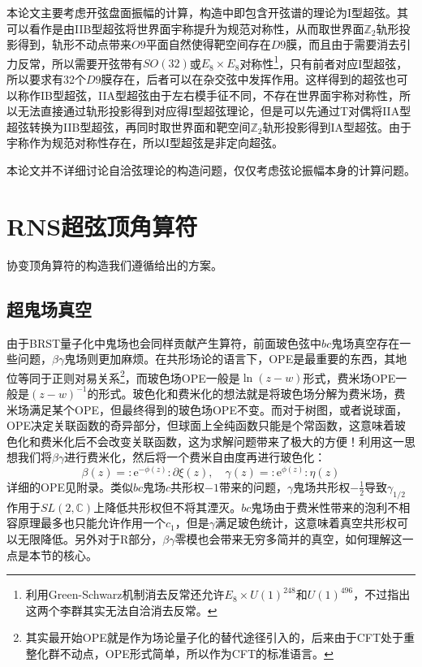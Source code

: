 本论文主要考虑开弦盘面振幅的计算，构造中即包含开弦谱的理论为I型超弦。其可以看作是由IIB型超弦将世界面宇称提升为规范对称性，从而取世界面$\mathbb{Z}_2$轨形投影得到，轨形不动点带来$O9$平面自然使得靶空间存在$D9$膜，而且由于需要消去引力反常，所以需要开弦带有$SO(32)$或$E_8\times E_8$对称性\footnote{利用Green-Schwarz机制消去反常还允许$E_8\times U(1)^{248}$和$U(1)^{496}$，不过\cite{PhysRevLett.105.071601}指出这两个李群其实无法自洽消去反常。}，只有前者对应I型超弦，所以要求有32个$D9$膜存在，后者可以在杂交弦中发挥作用。这样得到的超弦也可以称作IB型超弦，IIA型超弦由于左右模手征不同，不存在世界面宇称对称性，所以无法直接通过轨形投影得到对应得I型超弦理论，但是可以先通过T对偶将IIA型超弦转换为IIB型超弦，再同时取世界面和靶空间$\mathbb{Z}_2$轨形投影得到IA型超弦。由于宇称作为规范对称性存在，所以I型超弦是非定向超弦。

本论文并不详细讨论自洽弦理论的构造问题，仅仅考虑弦论振幅本身的计算问题。

\section{RNS超弦顶角算符}
协变顶角算符的构造我们遵循\cite{Friedan:1985ge,Knizhnik:1985ke}给出的方案。
\subsection{超鬼场真空}
由于BRST量子化中鬼场也会同样贡献产生算符，前面玻色弦中$bc$鬼场真空存在一些问题，$\beta\gamma$鬼场则更加麻烦。在共形场论的语言下，OPE是最重要的东西，其地位等同于正则对易关系\footnote{其实最开始OPE就是作为场论量子化的替代途径引入的，后来由于CFT处于重整化群不动点，OPE形式简单，所以作为CFT的标准语言。}，而玻色场OPE一般是$\ln(z-w)$形式，费米场OPE一般是$(z-w)^{-1}$的形式。玻色化和费米化的想法就是将玻色场分解为费米场，费米场满足某个OPE，但最终得到的玻色场OPE不变。而对于树图，或者说球面，OPE决定关联函数的奇异部分，但球面上全纯函数只能是个常函数，这意味着玻色化和费米化后不会改变关联函数，这为求解问题带来了极大的方便！利用这一思想我们将$\beta\gamma$进行费米化，然后将一个费米自由度再进行玻色化：
\begin{equation}
	\label{eq:3.19}
	\beta(z)=:\mathrm{e}^{-\phi(z)}:\partial\xi(z),\quad\gamma(z)=:\mathrm{e}^{\phi(z)}:\eta(z)
\end{equation}
详细的OPE见附录。类似$bc$鬼场$c$共形权$-1$带来的问题，$\gamma$鬼场共形权$-\frac12$导致$\gamma_{1/2}$作用于$SL(2,\mathbb{C})$上降低共形权但不将其湮灭。$bc$鬼场由于费米性带来的泡利不相容原理最多也只能允许作用一个$c_1$，但是$\gamma$满足玻色统计，这意味着真空共形权可以无限降低。另外对于R部分，$\beta\gamma$零模也会带来无穷多简并的真空，如何理解这一点是本节的核心。

